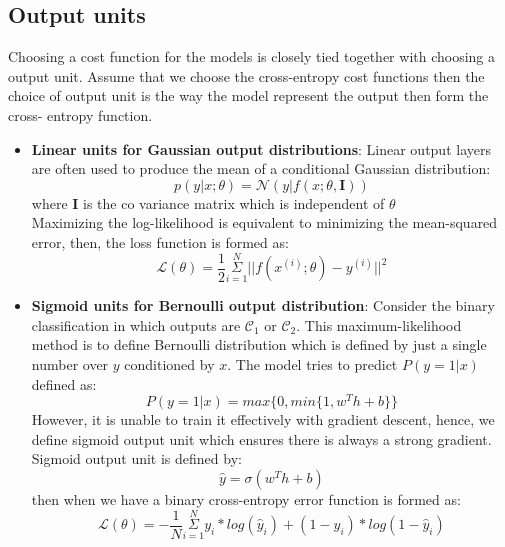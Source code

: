 \subsection{Output units}
Choosing a cost function for the models is closely tied together with choosing a output unit. Assume that we choose the cross-entropy cost functions then the choice of output unit is the way the model represent the output then form the cross- entropy function.\par
\begin{itemize}
    \item \textbf{Linear units for Gaussian output distributions}: Linear output layers are often used to produce the mean of a conditional Gaussian distribution:
    \begin{equation}
        p(y|x;\theta) = \mathcal{N}(y|f(x;\theta, \mathbf{I}))
    \end{equation}
    where $\mathbf{I}$ is the co variance matrix which is independent of $\theta$\\
    Maximizing the log-likelihood is equivalent to minimizing the mean-squared error, then, the loss function is formed as:
    \begin{equation}
        \mathcal{L}(\theta) = \frac{1}{2}\underset{i=1}{\overset{N}{\Sigma}}||f(x^{(i)};\theta) - y^{(i)}||^2
    \end{equation}
    \item \textbf{Sigmoid units for Bernoulli output distribution}: Consider the binary classification in which outputs are $\mathcal{C}_1$ or $\mathcal{C}_2$.
    This maximum-likelihood method is to define Bernoulli distribution which is defined by just a single number over $y$ conditioned by $x$. The model tries to predict $P(y=1|x)$ defined as:
    \begin{equation}
        P(y=1|x) = max\{0, min\{1, w^Th+b\}\}
    \end{equation}
    However, it is unable to train it effectively with gradient descent, hence, we define sigmoid output unit which ensures there is always a strong gradient. Sigmoid output unit is defined by:
    \begin{equation}
        \hat{y} = \sigma(w^Th + b)
    \end{equation}
    then when we have a binary cross-entropy error function is formed as:
    \begin{equation}
        \mathcal{L}(\theta) = -\frac{1}{N}\underset{i=1}{\overset{N}{\Sigma}}y_i*log(\hat{y}_i) + (1-y_i)*log(1-\hat{y}_i)
    \end{equation}

\end{itemize}
